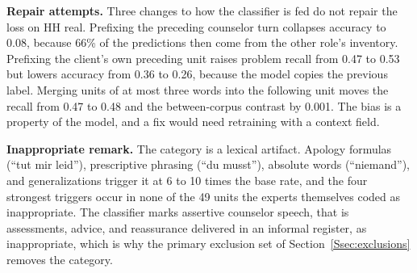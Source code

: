 \documentclass[fleqn,10pt]{JLA_article}
\newcommand{\fitwidth}[1]{\resizebox{\ifdim\width>\linewidth \linewidth\else \width\fi}{!}{#1}}
\begin{document}
\textbf{Repair attempts.} Three changes to how the classifier is fed do not repair the loss on HH real. Prefixing the preceding counselor turn collapses accuracy to 0.08, because 66\% of the predictions then come from the other role's inventory. Prefixing the client's own preceding unit raises problem recall from 0.47 to 0.53 but lowers accuracy from 0.36 to 0.26, because the model copies the previous label. Merging units of at most three words into the following unit moves the recall from 0.47 to 0.48 and the between-corpus contrast by 0.001. The bias is a property of the model, and a fix would need retraining with a context field.

\textbf{Inappropriate remark.} The category is a lexical artifact. Apology formulas (``tut mir leid''), prescriptive phrasing (``du musst''), absolute words (``niemand''), and generalizations trigger it at 6 to 10 times the base rate, and the four strongest triggers occur in none of the 49 units the experts themselves coded as inappropriate. The classifier marks assertive counselor speech, that is assessments, advice, and reassurance delivered in an informal register, as inappropriate, which is why the primary exclusion set of Section~\ref{Ssec:exclusions} removes the category.



\begin{table}[t]
\caption{Classifier against expert annotation for the categories that carry the signatures of Section~5.2 in the main paper, per human corpus. \emph{Exp.} and \emph{Model} are the shares of that role's units the experts and the classifier assign to the category, \emph{P}, \emph{R}, and \emph{F1} precision, recall, and F1 of the classifier against the experts. Client categories are shares of client units, counselor categories shares of counselor units. The counselor residual category does not exist in the German scheme of the HH roleplay annotation, so every unit the classifier places there is an error.}
\label{Stab:human-validation-categories}
\centering
\footnotesize
\setlength{\tabcolsep}{4pt}
\fitwidth{}
\end{table}

\begin{table}[t]
\caption{The three client-side signature buckets of Section~5.2 in the main paper under expert and classifier labels, on the experts' units. Shares are of client units with 95\% conversation-level bootstrap intervals, \emph{Ratio} is the classifier share over the expert share, and \emph{Recall} and \emph{Precision} are computed at bucket level, so a confusion inside the bucket does not count as an error.}
\label{Stab:human-validation-buckets}
\centering
\footnotesize
\setlength{\tabcolsep}{4pt}
\fitwidth{}
\end{table}
\end{document}
